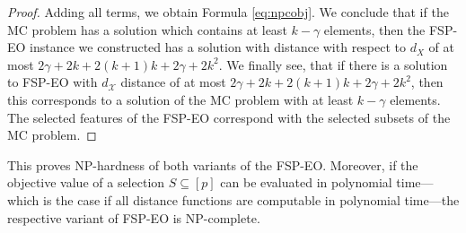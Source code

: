 \documentclass[11pt, a4paper]{article}
\newcommand{\fspeo}{FSP-EO\xspace}
\newcommand{\FRil}[1]{\todo[color=black, textcolor=white, inline, author=FR]{#1}}
\newcommand{\instfeatures}{[p]} %
\newcommand{\fsel}{S} %
\begin{document}
\begin{proof}

Adding all terms, we obtain Formula \eqref{eq:npcobj}. We conclude that if the MC problem has a solution which contains at least $k-\gamma$ elements, then the \fspeo instance we constructed has a solution with distance with respect to $d_X$ of at most $2\gamma + 2k + 2(k+1)k + 2\gamma + 2k^2$.
We finally see, that if there is a solution to \fspeo with $d_\mathcal{X}$ distance of at most $2\gamma + 2k + 2(k+1)k + 2\gamma + 2k^2$, then this corresponds to a solution of the MC problem with at least $k-\gamma$ elements. The selected features of the \fspeo correspond with the selected subsets of the MC problem.
\end{proof}


This proves NP-hardness of both variants of the \fspeo. Moreover, if the objective value of a selection  $\fsel \subseteq \instfeatures$ can be evaluated in polynomial time---which is the case if all distance functions are computable in polynomial time---the respective variant of \fspeo is NP-complete.
\end{document}
